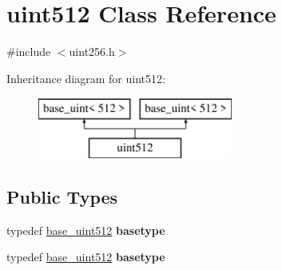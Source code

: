 \hypertarget{classuint512}{}\section{uint512 Class Reference}
\label{classuint512}


{\ttfamily \#include $<$uint256.\+h$>$}

Inheritance diagram for uint512\+:\begin{figure}[H]
\begin{center}
\leavevmode
\includegraphics[height=2.000000cm]{classuint512}
\end{center}
\end{figure}
\subsection*{Public Types}
\begin{DoxyCompactItemize}
\item 
\mbox{\label{classuint512_a314845bd6e75b48e672e8a2565bb8467}} 
typedef \mbox{\hyperlink{classbase__uint}{base\+\_\+uint512}} {\bfseries basetype}
\item 
\mbox{\label{classuint512_a314845bd6e75b48e672e8a2565bb8467}} 
typedef \mbox{\hyperlink{classbase__uint}{base\+\_\+uint512}} {\bfseries basetype}
\end{DoxyCompactItemize}
